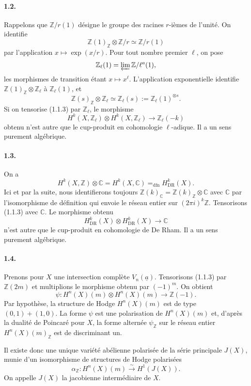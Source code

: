 \documentclass[10pt]{article}
\newcommand{\C}{\mathbb C}
\newcommand{\Z}{\mathbb Z}
\newcommand{\DR}{\mathrm{DR}}
\newcommand{\iso}{\xrightarrow{\sim}}
\begin{document}
\paragraph{1.2.} Rappelons que \(\Z/r(1)\) désigne le groupe des racines \(r\)-ièmes de l'unité. On identifie
\[
\Z(1)_\Z\otimes\Z/r \simeq \Z/r(1)
\]
par l'application \(x\mapsto \exp(x/r)\). Pour tout nombre premier \(\ell\), on pose
\[
\Z_\ell(1)=\varprojlim \Z/\ell^a(1),
\]
les morphismes de transition étant \(x\mapsto x^\ell\). L'application exponentielle identifie \(\Z(1)_\Z\otimes\Z_\ell\) à \(\Z_\ell(1)\), et
\[
\Z(s)_\Z\otimes\Z_\ell\simeq \Z_\ell(s):=\Z_\ell(1)^{\otimes s}.
\]
Si on tensorise (1.1.3) par \(\Z_\ell\), le morphisme
\[
\tag{1.2.1}
H^k(X,\Z_\ell)\otimes H^k(X,\Z_\ell)\longrightarrow\Z_\ell(-k)
\]
obtenu n'est autre que le cup-produit en cohomologie \(\ell\)-adique. Il a un sens purement algébrique.

\paragraph{1.3.} On a
\[
\tag{1.3.1}
H^k(X,\Z)\otimes\C=H^k(X,\C)=_{\mathrm{dfn}}H^k_{\DR}(X).
\]
Ici et par la suite, nous identifierons toujours \(\Z(k)_\C=\Z(k)_\Z\otimes\C\) avec \(\C\) par l'isomorphisme de définition qui envoie le réseau entier sur \((2\pi i)^k\Z\). Tensorisons (1.1.3) avec \(\C\). Le morphisme obtenu
\[
\tag{1.3.2}
H^k_{\DR}(X)\otimes H^k_{\DR}(X)\longrightarrow\C
\]
n'est autre que le cup-produit en cohomologie de De Rham. Il a un sens purement algébrique.

\paragraph{1.4.} Prenons pour \(X\) une intersection complète \(V_n(\underline a)\). Tensorisons (1.1.3) par \(\Z(2m)\) et multiplions le morphisme obtenu par \((-1)^m\). On obtient
\[
\tag{1.4.1}
\psi:H^n(X)(m)\otimes H^n(X)(m)\longrightarrow\Z(-1).
\]
Par hypothèse, la structure de Hodge \(H^n(X)(m)\) est de type \((0,1)+(1,0)\). La forme \(\psi\) est une polarisation de \(H^n(X)(m)\) et, d'après la dualité de Poincaré pour \(X\), la forme alternée \(\psi_\Z\) sur le réseau entier \(H^n(X)(m)_\Z\) est de discriminant un.

Il existe donc une unique variété abélienne polarisée de la série principale \(J(X)\), munie d'un isomorphisme de structures de Hodge polarisées
\[
\alpha_\Z:H^n(X)(m)\iso H^1(J(X)).
\]
On appelle \(J(X)\) la jacobienne intermédiaire de \(X\).
\end{document}
